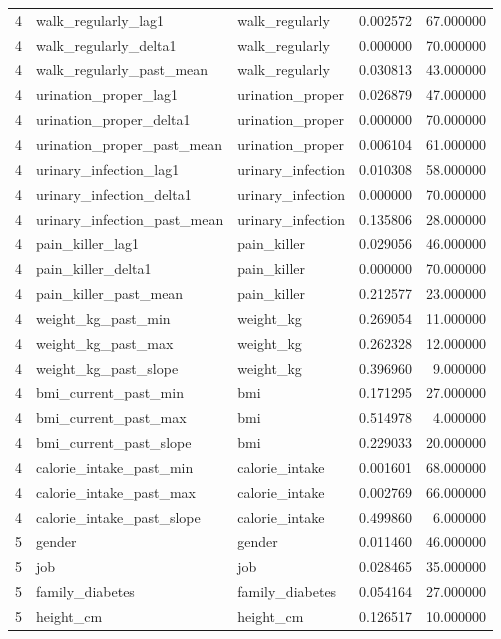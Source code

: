 \begin{longtable}{rllrr}
4 & walk\_regularly\_lag1 & walk\_regularly & 0.002572 & 67.000000 \\
4 & walk\_regularly\_delta1 & walk\_regularly & 0.000000 & 70.000000 \\
4 & walk\_regularly\_past\_mean & walk\_regularly & 0.030813 & 43.000000 \\
4 & urination\_proper\_lag1 & urination\_proper & 0.026879 & 47.000000 \\
4 & urination\_proper\_delta1 & urination\_proper & 0.000000 & 70.000000 \\
4 & urination\_proper\_past\_mean & urination\_proper & 0.006104 & 61.000000 \\
4 & urinary\_infection\_lag1 & urinary\_infection & 0.010308 & 58.000000 \\
4 & urinary\_infection\_delta1 & urinary\_infection & 0.000000 & 70.000000 \\
4 & urinary\_infection\_past\_mean & urinary\_infection & 0.135806 & 28.000000 \\
4 & pain\_killer\_lag1 & pain\_killer & 0.029056 & 46.000000 \\
4 & pain\_killer\_delta1 & pain\_killer & 0.000000 & 70.000000 \\
4 & pain\_killer\_past\_mean & pain\_killer & 0.212577 & 23.000000 \\
4 & weight\_kg\_past\_min & weight\_kg & 0.269054 & 11.000000 \\
4 & weight\_kg\_past\_max & weight\_kg & 0.262328 & 12.000000 \\
4 & weight\_kg\_past\_slope & weight\_kg & 0.396960 & 9.000000 \\
4 & bmi\_current\_past\_min & bmi & 0.171295 & 27.000000 \\
4 & bmi\_current\_past\_max & bmi & 0.514978 & 4.000000 \\
4 & bmi\_current\_past\_slope & bmi & 0.229033 & 20.000000 \\
4 & calorie\_intake\_past\_min & calorie\_intake & 0.001601 & 68.000000 \\
4 & calorie\_intake\_past\_max & calorie\_intake & 0.002769 & 66.000000 \\
4 & calorie\_intake\_past\_slope & calorie\_intake & 0.499860 & 6.000000 \\
5 & gender & gender & 0.011460 & 46.000000 \\
5 & job & job & 0.028465 & 35.000000 \\
5 & family\_diabetes & family\_diabetes & 0.054164 & 27.000000 \\
5 & height\_cm & height\_cm & 0.126517 & 10.000000 \\

\end{longtable}
